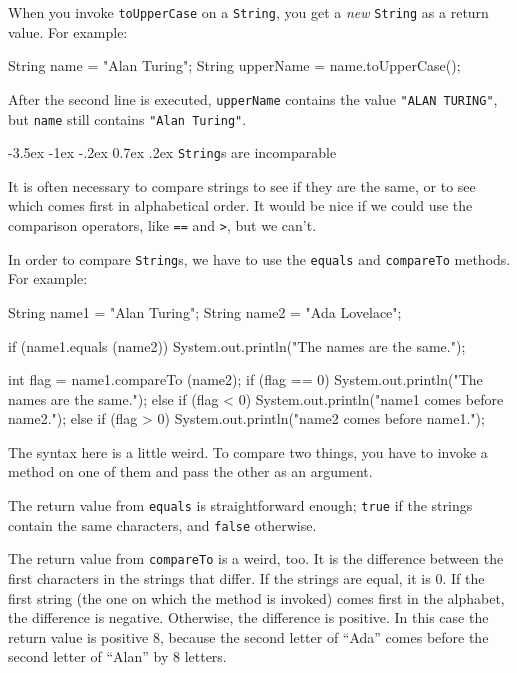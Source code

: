 \documentclass{book}
\makeatletter
\renewcommand{\section}{\@startsection 
    {section} {1} {0mm}%
    {-3.5ex \@plus -1ex \@minus -.2ex}%
    {0.7ex \@plus.2ex}%
    {\normalfont\Large\bfseries}}
\makeatother
\begin{document}
When you invoke {\tt toUpperCase} on a {\tt String}, you get a
{\em new} {\tt String} as a return value.  For example:

\begin{verbatimtab}
    String name = "Alan Turing";
    String upperName = name.toUpperCase();
\end{verbatimtab}
%
After the second line is executed, {\tt upperName} contains
the value {\tt "ALAN TURING"}, but {\tt name} still contains
{\tt "Alan Turing"}.


\section{{\tt String}s are incomparable}
\label{incomparable}

It is often necessary to compare strings to see if they are the same,
or to see which comes first in alphabetical order.  It would be
nice if we could use the comparison operators, like {\tt ==} and
{\tt >}, but we can't.

In order to compare {\tt String}s, we have to use the {\tt equals}
and {\tt compareTo} methods.  For example:

\begin{verbatimtab}
    String name1 = "Alan Turing";
    String name2 = "Ada Lovelace";

    if (name1.equals (name2)) {
      System.out.println("The names are the same.");
    }

    int flag = name1.compareTo (name2);
    if (flag == 0) {
      System.out.println("The names are the same.");
    } else if (flag < 0) {
      System.out.println("name1 comes before name2.");
    } else if (flag > 0) {
      System.out.println("name2 comes before name1.");
    }
\end{verbatimtab}
%
The syntax here is a little weird.  To compare two things, you
have to invoke a method on one of them and pass the other
as an argument.

The return value from {\tt equals} is straightforward enough;
{\tt true} if the strings contain the same characters, and
{\tt false} otherwise.

The return value from {\tt compareTo} is a weird, too.  It is
the difference between the first characters in the strings
that differ.  If the strings are equal, it is 0.  If the
first string (the one on which the method is invoked) comes
first in the alphabet, the difference is negative.  Otherwise,
the difference is positive.  In this case the return value
is positive 8, because the second letter of ``Ada'' comes
before the second letter of ``Alan'' by 8 letters.
\end{document}
